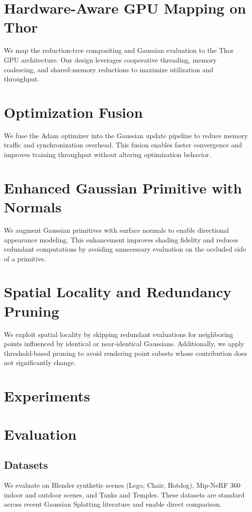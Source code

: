 \documentclass[10pt,twocolumn]{article}
\begin{document}
\section{Hardware-Aware GPU Mapping on Thor}
We map the reduction-tree compositing and Gaussian evaluation to the Thor GPU architecture. Our design leverages cooperative threading, memory coalescing, and shared-memory reductions to maximize utilization and throughput.

\section{Optimization Fusion}
We fuse the Adam optimizer into the Gaussian update pipeline to reduce memory traffic and synchronization overhead. This fusion enables faster convergence and improves training throughput without altering optimization behavior.

\section{Enhanced Gaussian Primitive with Normals}
We augment Gaussian primitives with surface normals to enable directional appearance modeling. This enhancement improves shading fidelity and reduces redundant computations by avoiding unnecessary evaluation on the occluded side of a primitive.

\section{Spatial Locality and Redundancy Pruning}
We exploit spatial locality by skipping redundant evaluations for neighboring points influenced by identical or near-identical Gaussians. Additionally, we apply threshold-based pruning to avoid rendering point subsets whose contribution does not significantly change.

\section{Experiments}

\section{Evaluation}
\subsection{Datasets}
We evaluate on Blender synthetic scenes (Lego, Chair, Hotdog), Mip-NeRF 360 indoor and outdoor scenes, and Tanks and Temples. These datasets are standard across recent Gaussian Splatting literature and enable direct comparison.
\end{document}
